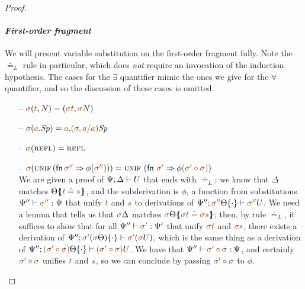 \begin{proof}
\begin{itemize}
\end{itemize}

\paragraph{\it First-order fragment} We will present variable
substitution on the first-order fragment fully. Note the $\doteq_L$
rule in particular, which does 
{\it not} require an invocation of the induction hypothesis. The cases
for the $\exists$ quantifier mimic the ones we give for the $\forall$
quantifier, and so the discussion of these cases is omitted.

\begin{itemize}

\item[--]
$\lf\sigma(\texistsr{\lf{t}}{N}) = \left(\texistsr{\lf{\sigma t}}{\lf\sigma{N}}
\right)$ 

\item[--]
$\lf\sigma(\texistsl{\lf{a}}{\Sp}) = \texistsl{\lf{a}}{\lf{(\sigma, a/a)}\Sp}$ 

\item[--]
$\lf\sigma(\tunifr) = \tunifr$

\item[--]
$\lf\sigma(\textsc{unif}\,({\sf fn}\,{\lf{\sigma''}} \Rightarrow \phi(\lf{\sigma''}))) = \textsc{unif}\,\left( \mathsf{fn}~\lf{\sigma'} \Rightarrow \phi \lf{(\sigma'
  \circ \sigma)}\right)$ \smallskip\\ 
%
  We are given a proof of ${\Psi};{\Delta} \vdash {U} \mathstrut$ that ends with
  ${\doteq}_L$; we know that $\Delta$ matches $\frameoff{\Theta}{\lf{t}
    \doteq \lf{s}}$, and the subderivation is $\phi$, a function from
  substitutions $\Psi'' \vdash \lf{\sigma''} : \Psi$ that unify $\lf{t}$ and $\lf{s}$
  to derivations of
  $\foc{\Psi''}{\tackon{\lf{\sigma''}\Theta}{\cdot}}{\lf{\sigma''}{U}}$. We need
  a lemma that tells us that $\lf\sigma\Delta$ matches
  $\frameoff{\lf\sigma\Theta}{\lf{\sigma t} \doteq \lf{\sigma s}}$; then, by rule
  ${\doteq}_L$, it suffices to show that for all $\Psi'' \vdash
  \lf{\sigma'} : \Psi'$ that unify $\lf{\sigma t}$ and $\lf{\sigma s}$, 
  there exists
  a derivation of $\foc{\Psi''}{\tackon{\lf{\sigma'}(\lf{\sigma}
      \Theta)}{\cdot}}{\lf{\sigma'}(\lf{\sigma} U)}$, which is the same thing as
  a derivation of $\foc{\Psi''}{\tackon{\lf{(\sigma' \circ \sigma)}
      \Theta}{\cdot}} {\lf{(\sigma' \circ \sigma)} U}$. We have that
  $\Psi'' \vdash \lf{\sigma' \circ \sigma} : \Psi$, and certainly $\lf{\sigma'
  \circ \sigma}$ unifies $\lf t$ and $\lf s$, so we can conclude by passing
  $\lf{\sigma' \circ \sigma}$ to $\phi$.\smallskip


\end{itemize}
\end{proof}
